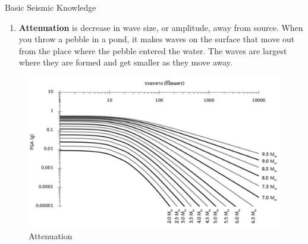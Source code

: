\documentclass{beamer}
\newcounter{saveenumi}
\newcommand{\seti}{\setcounter{saveenumi}{\value{enumi}}}
\newcommand{\conti}{\setcounter{enumi}{\value{saveenumi}}}
\begin{document}
	\begin{frame}[t]{Basic Seismic Knowledge}
		\begin{enumerate}
			\conti
			\item \textbf{Attenuation} is decrease in wave size, or amplitude, away from source. When you 
			throw a pebble in a pond, it makes waves on the surface that move out from the place where 
			the pebble entered the water. The waves are largest where they are formed and get smaller as 
			they move away.
			\seti
		\end{enumerate}
	
		\begin{figure}
			\includegraphics[scale=0.35]{anu.jpg}
			\caption{Attenuation}
		\end{figure}
	\end{frame}
\end{document}
